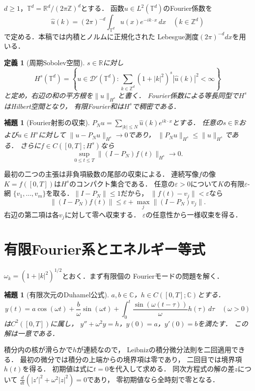 \documentclass[a5paper,10pt,onecolumn]{jsarticle}
\makeatletter
\theoremstyle{mathnotetheorem}
\newtheorem{definition}[theorem]{定義}
\newtheorem{lemma}[theorem]{補題}
\renewcommand{\proofname}{証明}
\renewenvironment{proof}[1][\proofname]{%
  \par\pushQED{\qed}\normalfont\topsep4\p@\@plus2\p@\relax
  \trivlist\item[\hskip\labelsep\bfseries #1]\ignorespaces
}{\popQED\endtrivlist\@endpefalse}
\makeatother
\begin{document}
$d\ge1$，$\mathbb T^d=\mathbb R^d/(2\pi\mathbb Z)^d$とする．
函数$u\in L^2(\mathbb T^d)$のFourier係数を
\[
 \widehat u(k)=(2\pi)^{-d}\int_{\mathbb T^d}
                 u(x)e^{-ik\cdot x}\,dx\quad(k\in\mathbb Z^d)
\]
で定める．本稿では内積とノルムに正規化された
Lebesgue測度$(2\pi)^{-d}dx$を用いる．

\begin{definition}[周期Sobolev空間]
$s\in\mathbb R$に対し
\[
 H^s(\mathbb T^d)=\left\{u\in\mathcal D'(\mathbb T^d):
 \sum_{k\in\mathbb Z^d}(1+|k|^2)^s|\widehat u(k)|^2<\infty
 \right\}
\]
と定め，右辺の和の平方根を$\|u\|_{H^s}$と書く．
Fourier係数による等長同型で$H^s$はHilbert空間となり，
有限Fourier和は$H^s$で稠密である．
\end{definition}

\begin{lemma}[Fourier射影の収束]\label{wave:lem:projection}
$P_Nu=\sum_{|k|\le N}\widehat u(k)e^{ik\cdot x}$とする．
任意の$s\in\mathbb R$および$u\in H^s$に対して
$\|u-P_Nu\|_{H^s}\to0$であり，
$\|P_Nu\|_{H^s}\le\|u\|_{H^s}$である．
さらに$f\in C([0,T];H^s)$なら
\[
 \sup_{0\le t\le T}\|(I-P_N)f(t)\|_{H^s}\longrightarrow0.
\]
\end{lemma}
\begin{proof}
最初の二つの主張は非負項級数の尾部の収束による．
連続写像$f$の像$K=f([0,T])$は$H^s$のコンパクト集合である．
任意の$\varepsilon>0$について$K$の有限$\varepsilon$-網
$\{v_1,\ldots,v_m\}$を取る．$\|I-P_N\|\le1$だから，
$\|f(t)-v_j\|<\varepsilon$なら
\[
 \|(I-P_N)f(t)\|
 \le\varepsilon+\max_j\|(I-P_N)v_j\|.
\]
右辺の第二項は各$v_j$に対して零へ収束する．
$\varepsilon$の任意性から一様収束を得る．
\end{proof}

\section{有限Fourier系とエネルギー等式}
$\omega_k=(1+|k|^2)^{1/2}$とおく．まず有限個の
Fourierモードの問題を解く．

\begin{lemma}[有限次元のDuhamel公式]\label{wave:lem:duhamel}
$a,b\in\mathbb C$，$h\in C([0,T];\mathbb C)$とする．
\[
 y(t)=a\cos(\omega t)+\frac b\omega\sin(\omega t)
 +\int_0^t\frac{\sin(\omega(t-\tau))}{\omega}
 h(\tau)\,d\tau\quad(\omega>0)
\]
は$C^2([0,T])$に属し，
$y''+\omega^2y=h$，$y(0)=a$，$y'(0)=b$を満たす．
この解は一意である．
\end{lemma}
\begin{proof}
積分内の核が滑らかで$h$が連続なので，
Leibnizの積分微分法則を二回適用できる．
最初の微分では積分の上端からの境界項は零であり，
二回目では境界項$h(t)$を得る．
初期値は式に$t=0$を代入して求める．
同次方程式の解の差$z$について
$\frac d{dt}(|z'|^2+\omega^2|z|^2)=0$であり，
零初期値なら全時刻で零となる．
\end{proof}
\end{document}
